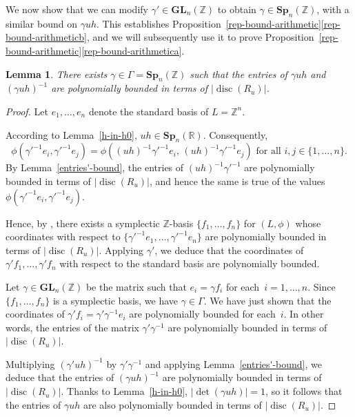 \documentclass[11pt]{article}
\numberwithin{equation}{section}
\newcommand{\bR}{\mathbb{R}}
\newcommand{\bZ}{\mathbb{Z}}
\newcommand{\gGL}{\mathbf{GL}}
\newcommand{\gSp}{\mathbf{Sp}}
\DeclareMathOperator{\disc}{disc}
\newcommand{\abs}[1]{\lvert #1 \rvert}
\newtheorem{lemma}{Lemma}[section]
\begin{document}
We now show that we can modify $\gamma' \in \gGL_n(\bZ)$ to obtain $\gamma \in \gSp_n(\bZ)$, with a similar bound on $\gamma uh$. This establishes Proposition~\ref{rep-bound-arithmetic}\eqref{rep-bound-arithmeticb}, and we will subsequently use it to prove Proposition~\ref{rep-bound-arithmetic}\eqref{rep-bound-arithmetica}.

\begin{lemma} \label{entries-bound}
There exists $\gamma \in \Gamma = \gSp_n(\bZ)$ such that the entries of $\gamma uh$ and $(\gamma uh)^{-1}$ are polynomially bounded in terms of $\abs{\disc(R_u)}$.
\end{lemma}

\begin{proof}
Let $e_1, \dotsc, e_n$ denote the standard basis of $L = \bZ^n$.

According to Lemma~\ref{h-in-h0}, $uh \in \gSp_n(\bR)$.
Consequently,
\[
\phi(\gamma'^{-1} e_i, \gamma'^{-1} e_j) = \phi((uh)^{-1}\gamma'^{-1} e_i, \, (uh)^{-1} \gamma'^{-1} e_j) \text{ for all } i, j \in \{ 1, \dotsc, n \}.
\]
By Lemma~\ref{entries'-bound}, the entries of $(uh)^{-1} \gamma'^{-1}$ are polynomially bounded in terms of $\abs{\disc(R_u)}$, and hence the same is true of the values $\phi(\gamma'^{-1} e_i, \gamma'^{-1} e_j)$.

Hence, by \cite[Lem.\,4.3]{Orr15}, there exists a symplectic $\bZ$-basis $\{ f_1, \dotsc, f_n \}$ for $(L, \phi)$ whose coordinates with respect to $\{ \gamma'^{-1}e_1, \dotsc, \gamma'^{-1}e_n \}$ are polynomially bounded in terms of $\abs{\disc(R_u)}$.
Applying $\gamma'$, we deduce that the coordinates of $\gamma' f_1, \dotsc, \gamma' f_n$ with respect to the standard basis are polynomially bounded.

Let $\gamma \in \gGL_n(\bZ)$ be the matrix such that $e_i = \gamma f_i$ for each~$i = 1, \dotsc, n$.
Since $\{ f_1, \dotsc, f_n \}$ is a symplectic basis, we have $\gamma \in \Gamma$.
We have just shown that the coordinates of $\gamma' f_i = \gamma' \gamma^{-1} e_i$ are polynomially bounded for each~$i$.
In other words, the entries of the matrix $\gamma' \gamma^{-1}$ are polynomially bounded in terms of $\abs{\disc(R_u)}$.

Multiplying $(\gamma'uh)^{-1}$ by $\gamma' \gamma^{-1}$ and applying Lemma~\ref{entries'-bound}, we deduce that the entries of $(\gamma uh)^{-1}$ are polynomially bounded in terms of $\abs{\disc(R_u)}$.
Thanks to Lemma~\ref{h-in-h0}, $\abs{\det(\gamma uh)} = 1$,
so it follows that the entries of $\gamma uh$ are also polynomially bounded in terms of $\abs{\disc(R_u)}$.
\end{proof}
\end{document}
